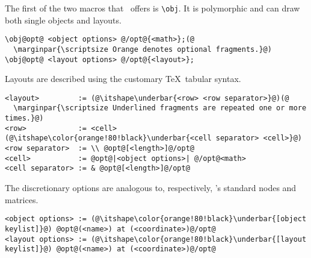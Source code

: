 The first of the two macros that \koDi\ offers is \lstinline|\obj|.
It is polymorphic and can draw both single objects and layouts.

\begin{lstlisting}
\obj@opt@ <object options> @/opt@{<math>};(@
  \marginpar{\scriptsize Orange denotes optional fragments.}@)
\obj@opt@ <layout options> @/opt@{<layout>};
\end{lstlisting}

Layouts are described using the customary \TeX\ tabular syntax.

\begin{lstlisting}
<layout>         := (@\itshape\underbar{<row> <row separator>}@)(@
  \marginpar{\scriptsize Underlined fragments are repeated one or more times.}@)
<row>            := <cell> (@\itshape\color{orange!80!black}\underbar{<cell separator> <cell>}@)
<row separator>  := \\ @opt@[<length>]@/opt@
<cell>           := @opt@|<object options>| @/opt@<math>
<cell separator> := & @opt@[<length>]@/opt@
\end{lstlisting}

The discretionary options are analogous to, respectively,
\TikZ's standard nodes and matrices.

\begin{lstlisting}
<object options> := (@\itshape\color{orange!80!black}\underbar{[object keylist]}@) @opt@(<name>) at (<coordinate>)@/opt@
<layout options> := (@\itshape\color{orange!80!black}\underbar{[layout keylist]}@) @opt@(<name>) at (<coordinate>)@/opt@
\end{lstlisting}














